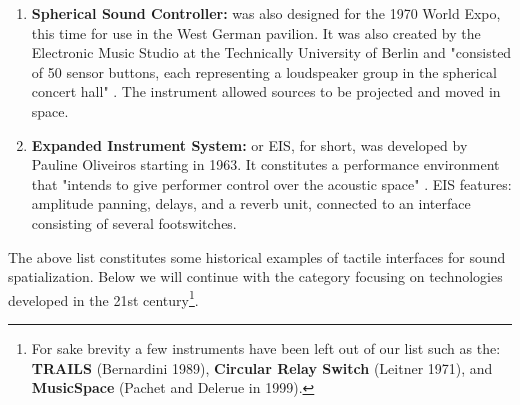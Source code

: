 \begin{enumerate}
    \item \textbf{Spherical Sound Controller:} was also designed for the 1970 World Expo, this time for use in the West German pavilion. It was also created by the Electronic Music Studio at the Technically University of Berlin and "consisted of 50 sensor buttons, each representing a loudspeaker group in the spherical concert hall" \cite{pysiewicz2017instruments}. The instrument allowed sources to be projected and moved in space.
    
    
    \item \textbf{Expanded Instrument System:} or EIS, for short, was developed by Pauline Oliveiros starting in 1963. It constitutes a performance environment that "intends to give performer control over the acoustic space" \cite{pysiewicz2017instruments}. EIS features: amplitude panning, delays, and a reverb unit, connected to an interface consisting of several footswitches.
    
\end{enumerate}

The above list constitutes some historical examples of tactile interfaces for sound spatialization. Below we will continue with the category focusing on technologies developed in the 21st century\footnote{For sake brevity a few instruments have been left out of our list such as the: \textbf{TRAILS} (Bernardini 1989), \textbf{Circular Relay Switch} (Leitner 1971), and \textbf{MusicSpace} (Pachet and Delerue in 1999).}.

